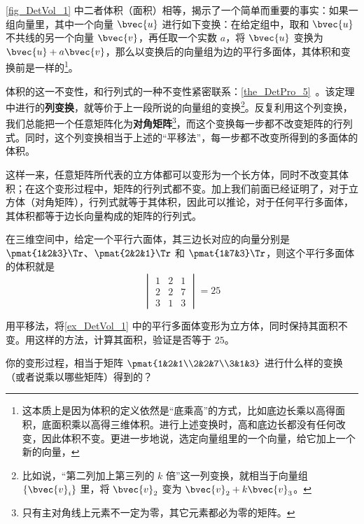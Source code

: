 \autoref{fig_DetVol_1} 中二者体积（面积）相等，揭示了一个简单而重要的事实：如果一组向量里，其中一个向量 $\bvec{u}$ 进行如下变换：在给定组中，取和 $\bvec{u}$ 不共线的另一个向量 $\bvec{v}$，再任取一个实数 $a$，将 $\bvec{u}$ 变换为 $\bvec{u}+a\bvec{v}$，那么以变换后的向量组为边的平行多面体，其体积和变换前是一样的\footnote{这本质上是因为体积的定义依然是“底乘高”的方式，比如底边长乘以高得面积，底面积乘以高得三维体积。进行上述变换时，高和底边长都没有任何改变，因此体积不变。更进一步地说，选定向量组里的一个向量，给它加上一个新的向量，}。

体积的这一不变性，和行列式的一种不变性紧密联系：\autoref{the_DetPro_5}~。该定理中进行的\textbf{列变换}，就等价于上一段所说的向量组的变换\footnote{比如说，“第二列加上第三列的 $k$ 倍”这一列变换，就相当于向量组 $\{\bvec{v}_i\}$ 里，将 $\bvec{v}_2$ 变为 $\bvec{v}_2+k\bvec{v}_3$。}。反复利用这个列变换，我们总能把一个任意矩阵化为\textbf{对角矩阵}\footnote{只有主对角线上元素不一定为零，其它元素都必为零的矩阵。}，而这个变换每一步都不改变矩阵的行列式。同时，这个列变换相当于上述的“平移法”，每一步都不改变所得到的多面体的体积。

这样一来，任意矩阵所代表的立方体都可以变形为一个长方体，同时不改变其体积；在这个变形过程中，矩阵的行列式都不变。加上我们前面已经证明了，对于立方体（对角矩阵），行列式就等于其体积，因此可以推论，对于任何平行多面体，其体积都等于边长向量构成的矩阵的行列式。

\begin{example}{}\label{ex_DetVol_1}
在三维空间中，给定一个平行六面体，其三边长对应的向量分别是 $\pmat{1&2&3}\Tr$、$\pmat{2&2&1}\Tr$ 和 $\pmat{1&7&3}\Tr$，则这个平行多面体的体积就是
\begin{equation}
\begin{vmatrix}
1&2&1\\
2&2&7\\
3&1&3
\end{vmatrix} = 25
\end{equation}
\end{example}

\begin{exercise}{}
用平移法，将\autoref{ex_DetVol_1} 中的平行多面体变形为立方体，同时保持其面积不变。用这样的方法，计算其面积，验证是否等于 $25$。

你的变形过程，相当于矩阵 $\pmat{1&2&1\\2&2&7\\3&1&3}$ 进行什么样的变换（或者说乘以哪些矩阵）得到的？
\end{exercise}


